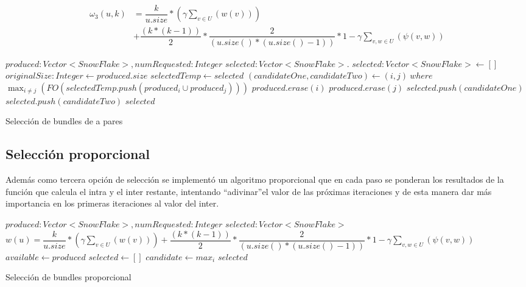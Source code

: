 \begin{equation}
\begin{split}
\omega_{3}(u,k) &= \dfrac{k}{u.size} * (\gamma \sum_{v \in U}(w(v))) \\
&+ \dfrac{(k * (k-1))}{2} * \dfrac{2}{(u.size() * (u.size() - 1))} * 1 - \gamma \sum_{v,w \in U}(\psi(v,w))
\end{split}
\end{equation}

\begin{algorithm}[H]
\begin{algorithmic}[1]
\REQUIRE $produced:Vector<SnowFlake>, numRequested:Integer$
\ENSURE $selected:Vector<SnowFlake>$.
\STATE $selected:Vector<SnowFlake> \leftarrow []$
\STATE $originalSize:Integer \leftarrow produced.size$
\STATE $selectedTemp \leftarrow selected$
\STATE $(candidateOne, candidateTwo) \leftarrow (i, j)\ where$ \\ 
$\displaystyle\max_{i \neq j} (FO(selectedTemp.push(produced_{i} \cup produced_{j})))$
\STATE $produced.erase(i)$
\STATE $produced.erase(j)$
\STATE $selected.push(candidateOne)$
\STATE $selected.push(candidateTwo)$
\ENDWHILE
\RETURN $selected$
\end{algorithmic}
\caption{Selección de bundles de a pares}\label{alg:algSelTuple}
\end{algorithm}
\subsection{Selección proporcional}
Además como tercera opción de selección se implementó un algoritmo proporcional que en cada paso se 
ponderan los resultados de la función que calcula el intra y el inter restante, intentando 
\textquotedblleft adivinar\textquotedblright  el valor de las próximas iteraciones y de esta manera 
dar más importancia en los primeras iteraciones al valor del inter.
\begin{algorithm}[H]
\begin{algorithmic}[1]
\REQUIRE $produced:Vector<SnowFlake>, numRequested:Integer$
\ENSURE $selected:Vector<SnowFlake>$
\STATE $w(u) = \dfrac{k}{u.size} * (\gamma \sum_{v \in U}(w(v))) + \dfrac{(k * (k-1))}{2} * \dfrac{2}{(u.size() * (u.size() - 1))} * 1 - \gamma \sum_{v,w \in U}(\psi(v,w))$
\STATE $available \leftarrow produced$
\STATE $selected \leftarrow []$
\STATE $candidate \leftarrow max_{i}$
\ENDWHILE
\RETURN $selected$
\end{algorithmic}
\caption{Selección de bundles proporcional}\label{alg:algSelProp}
\end{algorithm}

